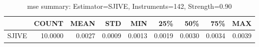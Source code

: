 \begin{table}[ht]
\centering
\caption{mse summary: Estimator=SJIVE, Instruments=142, Strength=0.90}
\begin{tabular}{lrrrrrrrr}
\toprule
 & COUNT & MEAN & STD & MIN & 25\% & 50\% & 75\% & MAX \\
\midrule
SJIVE & 10.0000 & 0.0027 & 0.0009 & 0.0013 & 0.0019 & 0.0030 & 0.0034 & 0.0039 \\
\bottomrule
\end{tabular}
\end{table}
